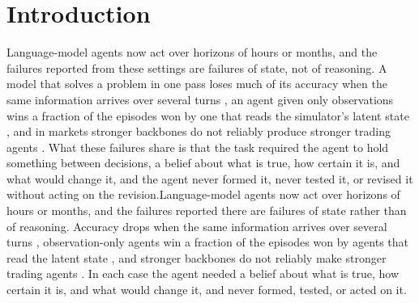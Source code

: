 \section{Introduction}
\label{sec:intro}



\ifnature Language-model agents now act over horizons of hours or months, and the failures reported from these settings are failures of state, not of reasoning. A model that solves a problem in one pass loses much of its accuracy when the same information arrives over several turns \citep{laban2025lost}, an agent given only observations wins a fraction of the episodes won by one that reads the simulator's latent state \citep{alaswad2026why}, and in markets stronger backbones do not reliably produce stronger trading agents \citep{xie2025finben,li2024investorbench}. What these failures share is that the task required the agent to hold something between decisions, a belief about what is true, how certain it is, and what would change it, and the agent never formed it, never tested it, or revised it without acting on the revision.\else Language-model agents now act over horizons of hours or months, and the failures reported there are failures of state rather than of reasoning. Accuracy drops when the same information arrives over several turns \citep{laban2025lost}, observation-only agents win a fraction of the episodes won by agents that read the latent state \citep{alaswad2026why}, and stronger backbones do not reliably make stronger trading agents \citep{xie2025finben,li2024investorbench}. In each case the agent needed a belief about what is true, how certain it is, and what would change it, and never formed, tested, or acted on it.\fi

